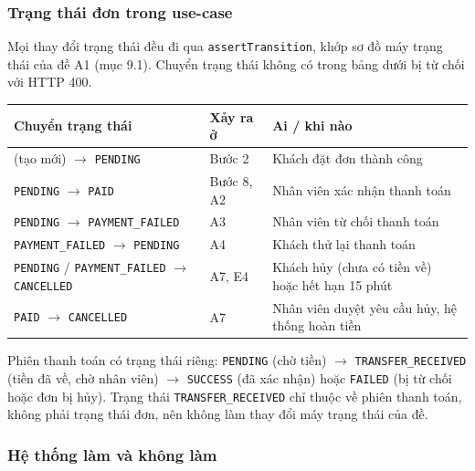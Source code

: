 \subsubsection{Trạng thái đơn trong use-case}

Mọi thay đổi trạng thái đều đi qua \texttt{assertTransition}, khớp sơ đồ máy trạng thái của đề A1 (mục 9.1).
Chuyển trạng thái không có trong bảng dưới bị từ chối với HTTP 400.

\begin{longtable}{@{}p{5.2cm}p{4.6cm}p{6.2cm}@{}}
\toprule
\textbf{Chuyển trạng thái} & \textbf{Xảy ra ở} & \textbf{Ai / khi nào} \\
\midrule
\endhead
(tạo mới) $\rightarrow$ \texttt{PENDING} & Bước 2 & Khách đặt đơn thành công \\
\texttt{PENDING} $\rightarrow$ \texttt{PAID} & Bước 8, A2 & Nhân viên xác nhận thanh toán \\
\texttt{PENDING} $\rightarrow$ \texttt{PAYMENT\_FAILED} & A3 & Nhân viên từ chối thanh toán \\
\texttt{PAYMENT\_FAILED} $\rightarrow$ \texttt{PENDING} & A4 & Khách thử lại thanh toán \\
\texttt{PENDING} / \texttt{PAYMENT\_FAILED} $\rightarrow$ \texttt{CANCELLED} & A7, E4 & Khách hủy (chưa có tiền về) hoặc hết hạn 15 phút \\
\texttt{PAID} $\rightarrow$ \texttt{CANCELLED} & A7 & Nhân viên duyệt yêu cầu hủy, hệ thống hoàn tiền \\
\bottomrule
\end{longtable}

Phiên thanh toán có trạng thái riêng: \texttt{PENDING} (chờ tiền) $\rightarrow$ \texttt{TRANSFER\_RECEIVED} (tiền đã về, chờ nhân viên) $\rightarrow$ \texttt{SUCCESS} (đã xác nhận) hoặc \texttt{FAILED} (bị từ chối hoặc đơn bị hủy).
Trạng thái \texttt{TRANSFER\_RECEIVED} chỉ thuộc về phiên thanh toán, không phải trạng thái đơn, nên không làm thay đổi máy trạng thái của đề.

\subsubsection{Hệ thống làm và không làm}

